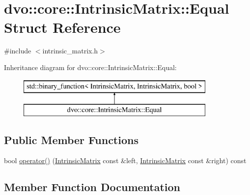 \hypertarget{structdvo_1_1core_1_1_intrinsic_matrix_1_1_equal}{}\section{dvo\+:\+:core\+:\+:Intrinsic\+Matrix\+:\+:Equal Struct Reference}
\label{structdvo_1_1core_1_1_intrinsic_matrix_1_1_equal}


{\ttfamily \#include $<$intrinsic\+\_\+matrix.\+h$>$}

Inheritance diagram for dvo\+:\+:core\+:\+:Intrinsic\+Matrix\+:\+:Equal\+:\begin{figure}[H]
\begin{center}
\leavevmode
\includegraphics[height=2.000000cm]{structdvo_1_1core_1_1_intrinsic_matrix_1_1_equal}
\end{center}
\end{figure}
\subsection*{Public Member Functions}
\begin{DoxyCompactItemize}
\item 
bool \mbox{\hyperlink{structdvo_1_1core_1_1_intrinsic_matrix_1_1_equal_ab7dd89f92d6cf3f7086481e3c168fcf6}{operator()}} (\mbox{\hyperlink{structdvo_1_1core_1_1_intrinsic_matrix}{Intrinsic\+Matrix}} const \&left, \mbox{\hyperlink{structdvo_1_1core_1_1_intrinsic_matrix}{Intrinsic\+Matrix}} const \&right) const
\end{DoxyCompactItemize}


\subsection{Member Function Documentation}
\mbox{\label{structdvo_1_1core_1_1_intrinsic_matrix_1_1_equal_ab7dd89f92d6cf3f7086481e3c168fcf6}} 
